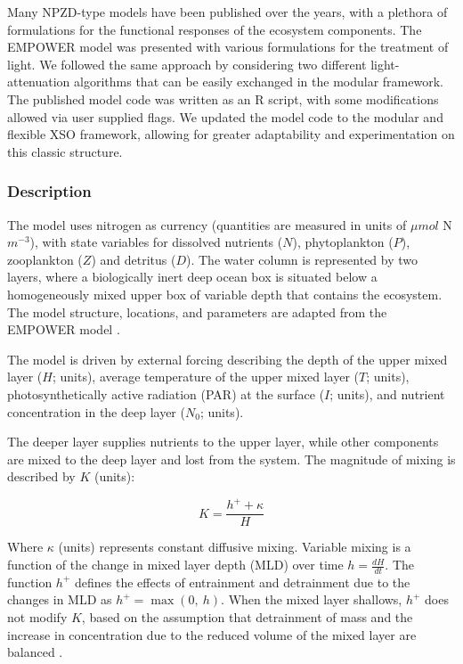 \documentclass[journal abbreviation, manuscript]{copernicus}
\begin{document}
Many NPZD-type models have been published over the years, with a plethora of formulations for the functional responses of the ecosystem components. The EMPOWER model was presented with various formulations for the treatment of light. We followed the same approach by considering two different light-attenuation algorithms that can be easily exchanged in the modular framework. The published model code was written as an R script, with some modifications allowed via user supplied flags. We updated the model code to the modular and flexible XSO framework, allowing for greater adaptability and experimentation on this classic structure.

\subsubsection{Description}
The model uses nitrogen as currency (quantities are measured in units of $\mu mol$ N $m^{-3}$), with state variables for dissolved nutrients ($N$), phytoplankton ($P$), zooplankton ($Z$) and detritus ($D$). The water column is represented by two layers, where a biologically inert deep ocean box is situated below a homogeneously mixed upper box of variable depth that contains the ecosystem. The model structure, locations, and parameters are adapted from the EMPOWER model \citep{Anderson2015c}.

The model is driven by external forcing describing the depth of the upper mixed layer ($H$; units), average temperature of the upper mixed layer ($T$; units), photosynthetically active radiation (PAR) at the surface ($I$; units), and nutrient concentration in the deep layer ($N_0$; units). 

The deeper layer supplies nutrients to the upper layer, while other components are mixed to the deep layer and lost from the system. The magnitude of mixing is described by $K$ (units):

\begin{equation}
    K = \frac{h^{+} + \kappa}{H}
\end{equation}

Where $\kappa$ (units) represents constant diffusive mixing. Variable mixing is a function of the change in mixed layer depth (MLD) over time $h = \frac{dH}{dt}$. The function $h^{+}$ defines the effects of entrainment and detrainment due to the changes in MLD as $h^{+} = \max(0, \ h)$. When the mixed layer shallows, $h^{+}$ does not modify $K$, based on the assumption that detrainment of mass and the increase in concentration due to the reduced volume of the mixed layer are balanced \citep{Evans1985ACycles}. 
\end{document}
